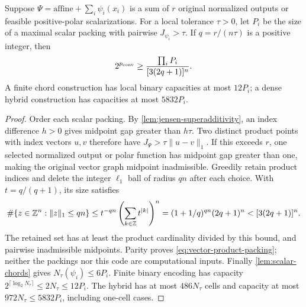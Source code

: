 \begin{lemma}\label{lem:vector-product-packing}
Suppose $\Psi=\text{affine}+\sum_i\psi_i(x_i)$ is a sum of $r$ original
normalized outputs or feasible positive-polar scalarizations. For a local
tolerance $\tau>0$, let $P_i$ be the size of a maximal scalar packing
with pairwise $J_{\psi_i}>\tau$. If $q=r/(n\tau)$ is a positive integer,
then
\begin{equation}\label{eq:vector-product-packing}
 2^{p_{\mathrm{conv}}}\ge\frac{\prod_iP_i}{[3(2q+1)]^n}.
\end{equation}
A finite chord construction has local binary capacities at most $12P_i$;
a dense hybrid construction has capacities at most $5832P_i$.
\end{lemma}
\begin{proof}
Order each scalar packing. By \cref{lem:jensen-superadditivity},
an index difference $h>0$ gives midpoint gap greater than $h\tau$.
Two distinct product points with index vectors $u,v$ therefore have
$J_\Psi>\tau\|u-v\|_1$. If this exceeds $r$, one selected normalized
output or polar function has midpoint gap greater than one, making the
original vector graph midpoint inadmissible.
Greedily retain product indices and delete the integer $\ell_1$ ball
of radius $qn$ after each choice. With $t=q/(q+1)$, its size satisfies
\[
 \#\{z\in\mathbb Z^n:\|z\|_1\le qn\}
 \le t^{-qn}\left(\sum_{k\in\mathbb Z}t^{|k|}\right)^n
 =(1+1/q)^{qn}(2q+1)^n<[3(2q+1)]^n.
\]
The retained set has at least the product cardinality divided by this
bound, and pairwise inadmissible midpoints. Parity proves
\eqref{eq:vector-product-packing}; neither the packings nor this code
are computational inputs. Finally \cref{lem:scalar-chords} gives
$N_\tau(\psi_i)\le6P_i$. Finite binary encoding has capacity
$2^{\lceil\log_2N_\tau\rceil}\le2N_\tau\le12P_i$.
The hybrid has at most $486N_\tau$ cells and capacity at most
$972N_\tau\le5832P_i$, including one-cell cases.
\end{proof}

